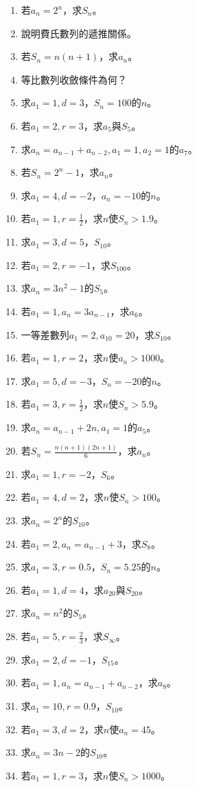 \begin{enumerate}[label=\arabic*.]
    \item 若$a_n = 2^n$，求$S_n$。
    \item 說明費氏數列的遞推關係。
    \item 若$S_n = n(n+1)$，求$a_n$。
    \item 等比數列收斂條件為何？
    \item 求$a_1 = 1, d = 3$，$S_n = 100$的$n$。
    \item 若$a_1 = 2, r = 3$，求$a_5$與$S_5$。
    \item 求$a_n = a_{n-1} + a_{n-2}, a_1 = 1, a_2 = 1$的$a_7$。
    \item 若$S_n = 2^n - 1$，求$a_n$。
    \item 求$a_1 = 4, d = -2$，$a_n = -10$的$n$。
    \item 若$a_1 = 1, r = \frac{1}{2}$，求$n$使$S_n > 1.9$。
    \item 求$a_1 = 3, d = 5$，$S_{10}$。
    \item 若$a_1 = 2, r = -1$，求$S_{100}$。
    \item 求$a_n = 3n^2 - 1$的$S_5$。
    \item 若$a_1 = 1, a_n = 3a_{n-1}$，求$a_6$。
    \item 一等差數列$a_1 = 2, a_{10} = 20$，求$S_{10}$。
    \item 若$a_1 = 1, r = 2$，求$n$使$a_n > 1000$。
    \item 求$a_1 = 5, d = -3$，$S_n = -20$的$n$。
    \item 若$a_1 = 3, r = \frac{1}{2}$，求$n$使$S_n > 5.9$。
    \item 求$a_n = a_{n-1} + 2n, a_1 = 1$的$a_5$。
    \item 若$S_n = \frac{n(n+1)(2n+1)}{6}$，求$a_n$。
    \item 求$a_1 = 1, r = -2$，$S_6$。
    \item 若$a_1 = 4, d = 2$，求$n$使$S_n > 100$。
    \item 求$a_n = 2^n$的$S_{10}$。
    \item 若$a_1 = 2, a_n = a_{n-1} + 3$，求$S_8$。
    \item 求$a_1 = 3, r = 0.5$，$S_n = 5.25$的$n$。
    \item 若$a_1 = 1, d = 4$，求$a_{20}$與$S_{20}$。
    \item 求$a_n = n^2$的$S_5$。
    \item 若$a_1 = 5, r = \frac{2}{3}$，求$S_\infty$。
    \item 求$a_1 = 2, d = -1$，$S_{15}$。
    \item 若$a_1 = 1, a_n = a_{n-1} + a_{n-2}$，求$a_8$。
    \item 求$a_1 = 10, r = 0.9$，$S_{10}$。
    \item 若$a_1 = 3, d = 2$，求$n$使$a_n = 45$。
    \item 求$a_n = 3n - 2$的$S_{10}$。
    \item 若$a_1 = 1, r = 3$，求$n$使$S_n > 1000$。
\end{enumerate}

